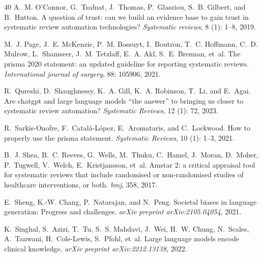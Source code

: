 \documentclass{article}
\begin{document}
\begin{thebibliography}{40}
A.~M. O’Connor, G.~Tsafnat, J.~Thomas, P.~Glasziou, S.~B. Gilbert, and
  B.~Hutton.
\newblock A question of trust: can we build an evidence base to gain trust in
  systematic review automation technologies?
\newblock \emph{Systematic reviews}, 8 (1): 1--8, 2019.

M.~J. Page, J.~E. McKenzie, P.~M. Bossuyt, I.~Boutron, T.~C. Hoffmann, C.~D.
  Mulrow, L.~Shamseer, J.~M. Tetzlaff, E.~A. Akl, S.~E. Brennan, et~al.
\newblock The prisma 2020 statement: an updated guideline for reporting
  systematic reviews.
\newblock \emph{International journal of surgery}, 88: 105906, 2021.

R.~Qureshi, D.~Shaughnessy, K.~A. Gill, K.~A. Robinson, T.~Li, and E.~Agai.
\newblock Are chatgpt and large language models “the answer” to bringing us
  closer to systematic review automation?
\newblock \emph{Systematic Reviews}, 12 (1): 72, 2023.

R.~Sarkis-Onofre, F.~Catal{\'a}-L{\'o}pez, E.~Aromataris, and C.~Lockwood.
\newblock How to properly use the prisma statement.
\newblock \emph{Systematic Reviews}, 10 (1): 1--3, 2021.

B.~J. Shea, B.~C. Reeves, G.~Wells, M.~Thuku, C.~Hamel, J.~Moran, D.~Moher,
  P.~Tugwell, V.~Welch, E.~Kristjansson, et~al.
\newblock Amstar 2: a critical appraisal tool for systematic reviews that
  include randomised or non-randomised studies of healthcare interventions, or
  both.
\newblock \emph{bmj}, 358, 2017.

E.~Sheng, K.-W. Chang, P.~Natarajan, and N.~Peng.
\newblock Societal biases in language generation: Progress and challenges.
\newblock \emph{arXiv preprint arXiv:2105.04054}, 2021.

K.~Singhal, S.~Azizi, T.~Tu, S.~S. Mahdavi, J.~Wei, H.~W. Chung, N.~Scales,
  A.~Tanwani, H.~Cole-Lewis, S.~Pfohl, et~al.
\newblock Large language models encode clinical knowledge.
\newblock \emph{arXiv preprint arXiv:2212.13138}, 2022.


\end{thebibliography}
\end{document}
